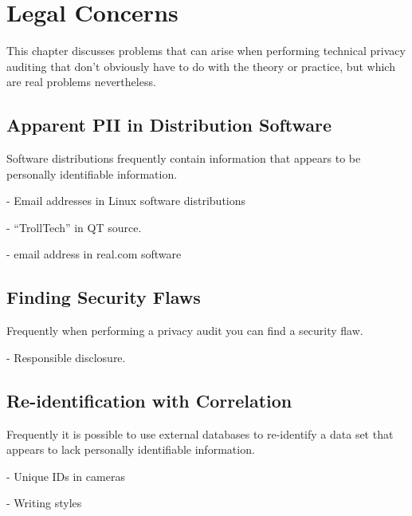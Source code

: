 \chapter{Legal Concerns}

This chapter discusses problems that can arise when performing
technical privacy auditing that don't obviously have to do with the
theory or practice, but which are real problems nevertheless.

\section{Apparent PII in Distribution Software}
Software distributions frequently contain information that appears to
be personally identifiable information. 

- Email addresses in Linux software distributions

- ``TrollTech'' in QT source.

- email address in real.com software

\section{Finding Security Flaws}

Frequently when performing a privacy audit you can find a security
flaw. 

- Responsible disclosure.

\section{Re-identification with Correlation}

Frequently it is possible to use external databases to re-identify
a data set that appears to lack personally identifiable information.

- Unique IDs in cameras

- Writing styles

